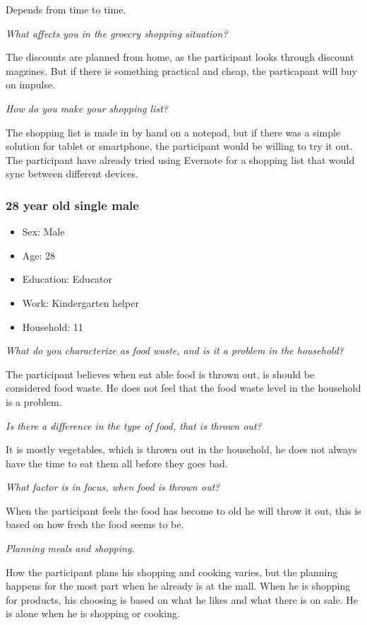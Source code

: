 Depends from time to time.

\emph{What affects you in the groecry shopping situation?}

The discounts are planned from home, as the participant looks through discount magzines. But if there is something practical and cheap, the particapant will buy on impulse.

\emph{How do you make your shopping list?}

The shopping list is made in by hand on a notepad, but if there was a simple solution for tablet or smartphone, the participant would be willing to try it out. The participant have already tried using Evernote for a shopping list that would sync between different devices.
\subsubsection{28 year old single male}
\begin{itemize}
  \item Sex: Male
  \item Age: 28
  \item Education: Educator
  \item Work: Kindergarten helper
  \item Household: 11
\end{itemize}
\emph{What do you characterize as food waste, and is it a problem in the household?}

The participant believes when eat able food is thrown out, is should be considered food waste. He does not feel that the food waste level in the household is a problem.

\emph{Is there a difference in the type of food, that is thrown out?}

It is mostly vegetables, which is thrown out in the household, he does not always have the time to eat them all before they goes bad.

\emph{What factor is in focus, when food is thrown out?}

When the participant feels the food has become to old he will throw it out, this is based on how fresh the food seems to be.

\emph{Planning meals and shopping.}

How the participant plans his shopping and cooking varies, but the planning happens for the most part when he already is at the mall. When he is shopping for products, his choosing is based on what he likes and what there is on sale. He is alone when he is shopping or cooking.

